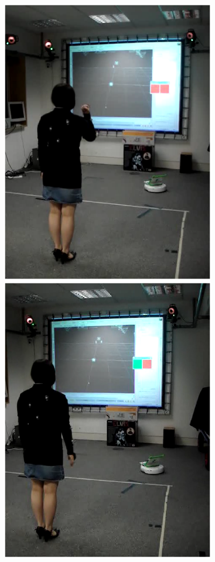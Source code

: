 \documentclass[12pt,a4,notitlepage]{report}
\renewcommand{\_}{\texttt{\symbol{95}}}
\newcommand{\<}{\texttt{\symbol{60}}}
\renewcommand{\>}{\texttt{\symbol{62}}}
\begin{document}
\begin{figure}
\includegraphics[scale=0.15,angle=0]{images/live2.ps}
\includegraphics[scale=0.15,angle=0]{images/live3.ps}

\end{figure}
\end{document}
